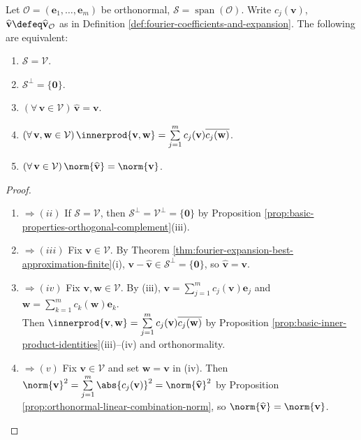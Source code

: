\begin{theorem} \label{thm:finite-orthonormal-basis-characterizations} \\
Let $\mathcal{O}=(\mathbf{e}_1,\ldots,\mathbf{e}_m)$ be orthonormal, $\mathcal{S}=\operatorname{span}(\mathcal{O})$. Write $c_j(\mathbf{v})$, $\widehat{\mathbf{v}}\defeq\widehat{\mathbf{v}}_{\mathcal{O}}$ as in Definition \ref{def:fourier-coefficients-and-expansion}. The following are equivalent:
\begin{enumerate}[label=(\roman*)]
\setlength{\itemsep}{0pt}
\item $\mathcal{S}=\mathcal{V}$.
\item $\mathcal{S}^{\perp}=\{\mathbf{0}\}$.
\item $(\forall\,\mathbf{v}\in\mathcal{V})\,\widehat{\mathbf{v}}=\mathbf{v}$.
\item $(\forall\,\mathbf{v},\mathbf{w}\in\mathcal{V})\,\innerprod{\mathbf{v},\mathbf{w}} = \sum\limits_{j=1}^{m}c_j(\mathbf{v})\overline{c_j(\mathbf{w})}$.
\item $(\forall\,\mathbf{v}\in\mathcal{V})\,\norm{\widehat{\mathbf{v}}}=\norm{\mathbf{v}}$.
\end{enumerate}
\begin{proof}
\begin{enumerate}[label=(\roman*)]
\setlength{\itemsep}{0pt}
\item[$(i)$]$\Rightarrow (ii)$ If $\mathcal{S}=\mathcal{V}$, then $\mathcal{S}^{\perp}=\mathcal{V}^{\perp}=\{\mathbf{0}\}$ by Proposition \ref{prop:basic-properties-orthogonal-complement}(iii).
\item[$(ii)$]$\Rightarrow (iii)$ Fix $\mathbf{v}\in\mathcal{V}$. By Theorem \ref{thm:fourier-expansion-best-approximation-finite}(i), $\mathbf{v}-\widehat{\mathbf{v}}\in\mathcal{S}^{\perp}=\{\mathbf{0}\}$, so $\widehat{\mathbf{v}}=\mathbf{v}$. 
\item[$(iii)$]$\Rightarrow (iv)$ Fix $\mathbf{v},\mathbf{w}\in\mathcal{V}$. By (iii), $\mathbf{v}=\sum\limits_{j=1}^{m}c_j(\mathbf{v})\mathbf{e}_j$ and $\mathbf{w}=\sum\limits_{k=1}^{m}c_k(\mathbf{w})\mathbf{e}_k$.\\
Then $\innerprod{\mathbf{v},\mathbf{w}}=\sum\limits_{j=1}^{m}c_j(\mathbf{v})\overline{c_j(\mathbf{w})}$ by Proposition \ref{prop:basic-inner-product-identities}(iii)--(iv) and orthonormality. 
\item[$(iv)$]$\Rightarrow (v)$ Fix $\mathbf{v}\in\mathcal{V}$ and set $\mathbf{w}=\mathbf{v}$ in (iv). Then $\norm{\mathbf{v}}^2=\sum\limits_{j=1}^{m}\abs{c_j(\mathbf{v})}^2=\norm{\widehat{\mathbf{v}}}^2$ by Proposition \ref{prop:orthonormal-linear-combination-norm}, so $\norm{\widehat{\mathbf{v}}}=\norm{\mathbf{v}}$. 

\end{enumerate}
\end{proof}
\end{theorem}
